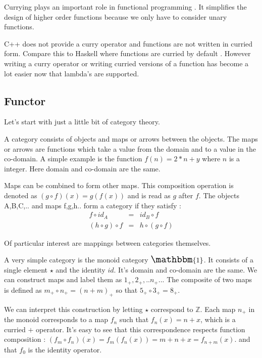 \documentclass[12pt,fleqn]{article}
\begin{document}
Currying plays an important role in functional programming \cite{field}. 
It simplifies the design of higher order functions because we only have to consider unary functions.

C++ does not provide a curry operator and functions are not written in curried form. 
Compare this to Haskell where functions are curried by default \cite{lipovaca, hutton}.
However writing a curry operator or writing curried versions of a function has become a lot easier now that lambda's are supported.



%
%
\subsection{Functor}
\label{subsec:functor}
%
%
%
Let's start with just a little bit of category theory.

A category consists of objects and maps or arrows between the objects.
The maps or arrows are functions which take a value from the domain and to a value in the co-domain. A simple example is the function $f(n) = 2*n + y$ 
where $n$ is a integer. Here domain and co-domain are the same.

Maps can be combined to form other maps.
This composition operation is denoted as $(g \circ f)(x) = g(f(x))$ and is read as $g$ after $f$.
The  objects A,B,C,.. and maps f,g,h.. form a category if they satisfy :
\begin{eqnarray*}
f \circ id_{A} &=& id_{B} \circ f \\
(h \circ g) \circ f &=& h \circ (g \circ f)
\end{eqnarray*}

Of particular interest are mappings between categories themselves.

A very simple category is the monoid category $\Large \mathbbm{1}$.
It consists of a single element $\star$ and the identity $id$.
It's domain and co-domain are the same.
We can construct maps and label them as $1_+, 2_+,..n_+..$.
The composite of two maps is defined as $m_+ \circ n_+ = (n+m)_+$ so that $5_+ \circ 3_+ = 8_+$.

We can interpret this construction by letting $\star$ correspond to $\mathbb{Z}$.
Each map $n_+$ in the monoid corresponds to a map $f_n$ such that $f_{n}(x) = n + x$, which is a curried $+$ operator. 
It's easy to see that this correspondence respects function composition : $(f_m \circ f_n) (x) = f_m(f_n(x)) = m + n + x = f_{n+m}(x)$.
and that $f_0$ is the identity operator.
\end{document}
